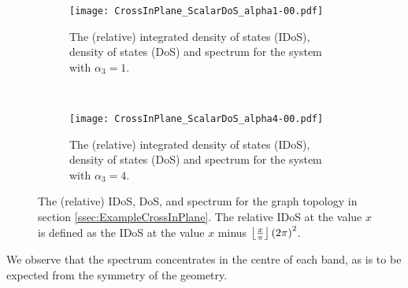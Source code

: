 \begin{figure}[t!]
	\begin{subfigure}[t]{0.45\textwidth}
		\centering
		\texttt{[image: CrossInPlane\_ScalarDoS\_alpha1-00.pdf]}
		\caption[]{\label{fig:CrossInPlane_ScalarDoS_alpha1-00} The (relative) integrated density of states (IDoS), density of states (DoS) and spectrum for the system with $\alpha_3=1$.}
	\end{subfigure}
	~
	\begin{subfigure}[t]{0.45\textwidth}
		\centering
		\texttt{[image: CrossInPlane\_ScalarDoS\_alpha4-00.pdf]}
		\caption[]{\label{fig:CrossInPlane_ScalarDoS_alpha4-00} The (relative) integrated density of states (IDoS), density of states (DoS) and spectrum for the system with $\alpha_3=4$.}
	\end{subfigure}	
	\caption[The spectrum and density of states for the problem \eqref{eq:SingularScalarWaveEqn} on the cross-in-the-plane geometry.]{\label{fig:CrossInPlane_ScalarDoS} The (relative) IDoS, DoS, and spectrum for the graph topology in section \ref{ssec:ExampleCrossInPlane}.
	The relative IDoS at the value $x$ is defined as the IDoS at the value $x$ minus $\left\lfloor\frac{x}{\pi}\right\rfloor\left( 2\pi \right)^2$.}
\end{figure}
We observe that the spectrum concentrates in the centre of each band, as is to be expected from the symmetry of the geometry.